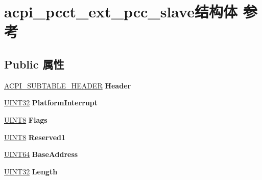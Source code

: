 \hypertarget{structacpi__pcct__ext__pcc__slave}{}\section{acpi\+\_\+pcct\+\_\+ext\+\_\+pcc\+\_\+slave结构体 参考}
\label{structacpi__pcct__ext__pcc__slave}
\subsection*{Public 属性}
\begin{DoxyCompactItemize}
\item 
\mbox{\label{structacpi__pcct__ext__pcc__slave_a58cf7ce36429fb02f6f076d84b53e9e0}} 
\hyperlink{structacpi__subtable__header}{A\+C\+P\+I\+\_\+\+S\+U\+B\+T\+A\+B\+L\+E\+\_\+\+H\+E\+A\+D\+ER} {\bfseries Header}
\item 
\mbox{\label{structacpi__pcct__ext__pcc__slave_a373de92e19345553ec425c8934ecd8aa}} 
\hyperlink{_processor_bind_8h_ae1e6edbbc26d6fbc71a90190d0266018}{U\+I\+N\+T32} {\bfseries Platform\+Interrupt}
\item 
\mbox{\label{structacpi__pcct__ext__pcc__slave_a607b53b849cec52ad6bcf0fa14fa5e18}} 
\hyperlink{_processor_bind_8h_ab27e9918b538ce9d8ca692479b375b6a}{U\+I\+N\+T8} {\bfseries Flags}
\item 
\mbox{\label{structacpi__pcct__ext__pcc__slave_a2d978f715e3c911e1191cc46e606b568}} 
\hyperlink{_processor_bind_8h_ab27e9918b538ce9d8ca692479b375b6a}{U\+I\+N\+T8} {\bfseries Reserved1}
\item 
\mbox{\label{structacpi__pcct__ext__pcc__slave_ad6e6715fc7ed4ce8554f3faef40bfe43}} 
\hyperlink{_processor_bind_8h_a57be03562867144161c1bfee95ca8f7c}{U\+I\+N\+T64} {\bfseries Base\+Address}
\item 
\mbox{\label{structacpi__pcct__ext__pcc__slave_a300520f88209a29c7205a8d782238440}} 
\hyperlink{_processor_bind_8h_ae1e6edbbc26d6fbc71a90190d0266018}{U\+I\+N\+T32} {\bfseries Length}
\item 

\end{DoxyCompactItemize}
